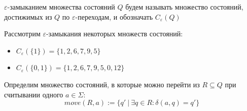\documentclass[11pt]{article}
\begin{document}
\begin{definition}
    $\varepsilon \text{-замыканием}$ множества состояний $Q$ будем 
    называть множество состояний, достижимых из $Q$ по $\varepsilon 
    \text{-переходам}$, и обозначать $C_{\varepsilon}(Q)$
\end{definition}

\begin{example}
    Рассмотрим $\varepsilon \text{-замыкания}$ некоторых множеств 
    состояний:
    \begin{itemize}
        \item $C_{\varepsilon}(\{1\}) = \{1, 2, 6, 7, 9, 5\}$
        \item $C_{\varepsilon}(\{0, 1\}) = \{1, 2, 6, 7, 9, 5, 0, 12\}$
    \end{itemize}
\end{example}

\begin{definition}
    Определим множество состояний, в которые можно перейти из 
    $R \subseteq Q$ при считывании одного $a \in \Sigma$:
    \[move(R, a) := \{q' \ | \ \exists q \in R : \delta (a, q) = q'\}\]
\end{definition}
\end{document}
